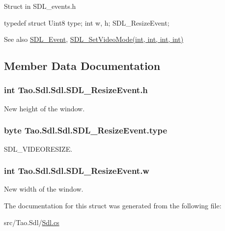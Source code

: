 Struct in SDL\_\-events.h 
\begin{DoxyCode}
            typedef struct{
                        Uint8 type;
                        int w, h;
                } SDL_ResizeEvent;
\end{DoxyCode}
 \begin{DoxySeeAlso}{See also}
\hyperlink{struct_tao_1_1_sdl_1_1_s_d_l___event}{SDL\_\-Event}, \hyperlink{_sdl_8cs_a961f7efdc2a7ec3860e93140853092f7}{SDL\_\-SetVideoMode(int, int, int, int)}


\end{DoxySeeAlso}


\subsection{Member Data Documentation}
\hypertarget{struct_tao_1_1_sdl_1_1_sdl_1_1_s_d_l___resize_event_a70a07c2d10124122f44f28d4fb83e4b7}{
\subsubsection[{h}]{\setlength{\rightskip}{0pt plus 5cm}int {\bf Tao.Sdl.Sdl.SDL\_\-ResizeEvent.h}}}
\label{struct_tao_1_1_sdl_1_1_sdl_1_1_s_d_l___resize_event_a70a07c2d10124122f44f28d4fb83e4b7}


New height of the window. 

\hypertarget{struct_tao_1_1_sdl_1_1_sdl_1_1_s_d_l___resize_event_a7fa36da4af0c8c0cff8c2cdbfb95deae}{
\subsubsection[{type}]{\setlength{\rightskip}{0pt plus 5cm}byte {\bf Tao.Sdl.Sdl.SDL\_\-ResizeEvent.type}}}
\label{struct_tao_1_1_sdl_1_1_sdl_1_1_s_d_l___resize_event_a7fa36da4af0c8c0cff8c2cdbfb95deae}


SDL\_\-VIDEORESIZE. 

\hypertarget{struct_tao_1_1_sdl_1_1_sdl_1_1_s_d_l___resize_event_a8f6f20c5400a87f876c1bfb86142e449}{
\subsubsection[{w}]{\setlength{\rightskip}{0pt plus 5cm}int {\bf Tao.Sdl.Sdl.SDL\_\-ResizeEvent.w}}}
\label{struct_tao_1_1_sdl_1_1_sdl_1_1_s_d_l___resize_event_a8f6f20c5400a87f876c1bfb86142e449}


New width of the window. 



The documentation for this struct was generated from the following file:\begin{DoxyCompactItemize}
\item 
src/Tao.Sdl/\hyperlink{_sdl_8cs}{Sdl.cs}\end{DoxyCompactItemize}
